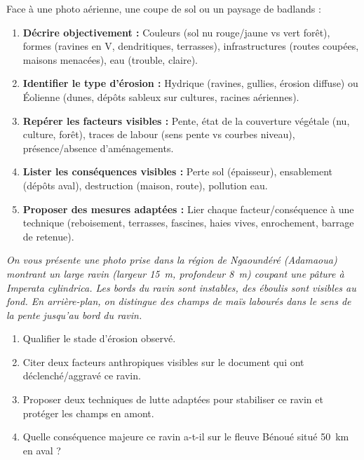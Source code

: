 \documentclass[11pt]{article}
\begin{document}
\begin{methode}
Face à une photo aérienne, une coupe de sol ou un paysage de badlands :
\begin{enumerate}
    \item \textbf{Décrire objectivement :} Couleurs (sol nu rouge/jaune vs vert forêt), formes (ravines en V, dendritiques, terrasses), infrastructures (routes coupées, maisons menacées), eau (trouble, claire).
    \item \textbf{Identifier le type d'érosion :} Hydrique (ravines, gullies, érosion diffuse) ou Éolienne (dunes, dépôts sableux sur cultures, racines aériennes).
    \item \textbf{Repérer les facteurs visibles :} Pente, état de la couverture végétale (nu, culture, forêt), traces de labour (sens pente vs courbes niveau), présence/absence d'aménagements.
    \item \textbf{Lister les conséquences visibles :} Perte sol (épaisseur), ensablement (dépôts aval), destruction (maison, route), pollution eau.
    \item \textbf{Proposer des mesures adaptées :} Lier chaque facteur/conséquence à une technique (reboisement, terrasses, fascines, haies vives, enrochement, barrage de retenue).
\end{enumerate}
\end{methode}

\begin{exercice}
\textit{On vous présente une photo prise dans la région de Ngaoundéré (Adamaoua) montrant un large ravin (largeur \SI{15}{m}, profondeur \SI{8}{m}) coupant une pâture à \textit{Imperata cylindrica}. Les bords du ravin sont instables, des éboulis sont visibles au fond. En arrière-plan, on distingue des champs de maïs labourés dans le sens de la pente jusqu'au bord du ravin.}
\begin{enumerate}
    \item Qualifier le stade d'érosion observé.
    \item Citer deux facteurs anthropiques visibles sur le document qui ont déclenché/aggravé ce ravin.
    \item Proposer deux techniques de lutte adaptées pour stabiliser ce ravin et protéger les champs en amont.
    \item Quelle conséquence majeure ce ravin a-t-il sur le fleuve Bénoué situé \SI{50}{km} en aval ?
\end{enumerate}
\end{exercice}
\end{document}
